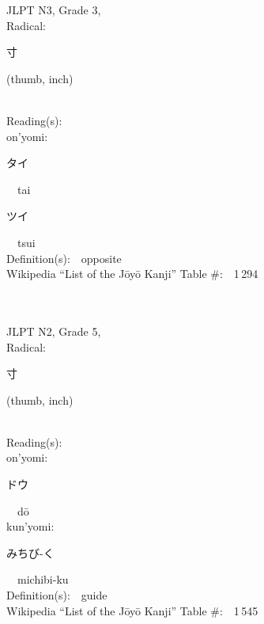 \begin{multicols}{2}
{JLPT N3, Grade 3, \\Radical:\ \ {\begin{CJK}{UTF8}{min} 寸 \end{CJK}} (thumb, inch) } \\
Reading(s):\ \ \\
{\hspace*{1em}}on'yomi:\ \ \\
{\hspace*{2em}}{\begin{CJK}{UTF8}{min} タイ \end{CJK}}\ \ tai\ \ \\
{\hspace*{2em}}{\begin{CJK}{UTF8}{min} ツイ \end{CJK}}\ \ tsui\ \ \\
Definition(s):\ \ opposite \\
Wikipedia ``List of the J\=oy\=o Kanji'' Table \#:\ \ 1\,294 \\
\ \ \\
{\fontsize{34pt}{40pt}  }\ \ \\  %
{JLPT N2, Grade 5, \\Radical:\ \ {\begin{CJK}{UTF8}{min} 寸 \end{CJK}} (thumb, inch) } \\
Reading(s):\ \ \\
{\hspace*{1em}}on'yomi:\ \ \\
{\hspace*{2em}}{\begin{CJK}{UTF8}{min} ドウ \end{CJK}}\ \ d\=o\ \ \\
{\hspace*{1em}}kun'yomi:\ \ \\
{\hspace*{2em}}{\begin{CJK}{UTF8}{min} みちび-く \end{CJK}}\ \ michibi-ku\ \ \\
Definition(s):\ \ guide \\
Wikipedia ``List of the J\=oy\=o Kanji'' Table \#:\ \ 1\,545 \\
\ \ \\
{\fontsize{34pt}{40pt}  }\ \ \\  %

\end{multicols}
